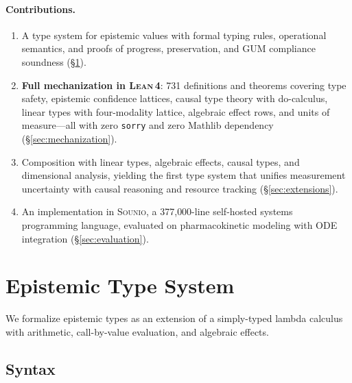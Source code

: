 \documentclass[acmsmall,screen,review,anonymous]{acmart}
\newcommand{\sounio}{\textsc{Sounio}\xspace}
\newcommand{\lean}{\textsc{Lean\,4}\xspace}
\begin{document}
\paragraph{Contributions.}
\begin{enumerate}
  \item A type system for epistemic values with formal typing rules,
        operational semantics, and proofs of progress, preservation,
        and GUM compliance soundness (\S\ref{sec:type-system}).

  \item \textbf{Full mechanization in \lean}: 731 definitions and
        theorems covering type safety, epistemic confidence lattices,
        causal type theory with do-calculus, linear types with
        four-modality lattice, algebraic effect rows, and units of
        measure---all with zero \texttt{sorry} and zero Mathlib
        dependency (\S\ref{sec:mechanization}).

  \item Composition with linear types, algebraic effects, causal types,
        and dimensional analysis, yielding the first type system that
        unifies measurement uncertainty with causal reasoning and
        resource tracking (\S\ref{sec:extensions}).

  \item An implementation in \sounio, a 377{,}000-line self-hosted systems programming
        language, evaluated on pharmacokinetic modeling with ODE
        integration (\S\ref{sec:evaluation}).
\end{enumerate}

\section{Epistemic Type System}
\label{sec:type-system}

We formalize epistemic types as an extension of a simply-typed lambda
calculus with arithmetic, call-by-value evaluation, and algebraic effects.

\subsection{Syntax}
\end{document}
